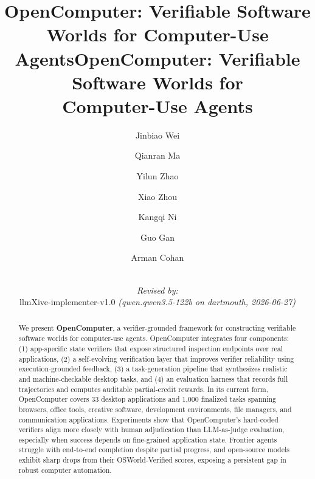 \documentclass{llmxive}
\title{OpenComputer: Verifiable Software Worlds for Computer-Use Agents}
\author{Jinbiao Wei \and Qianran Ma \and Yilun Zhao \and Xiao Zhou \and Kangqi Ni \and Guo Gan \and Arman Cohan}
\providecommand{\ours}{OpenComputer\xspace}
\providecommand{\headrulewidth}{0pt}
\begin{document}
\maketitle
\begin{abstract}
We present \textbf{\ours}, a verifier-grounded framework for constructing verifiable software worlds for computer-use agents. \ours integrates four components: 
(1) app-specific state verifiers that expose structured inspection endpoints over real applications, 
(2) a self-evolving verification layer that improves verifier reliability using execution-grounded feedback, 
(3) a task-generation pipeline that synthesizes realistic and machine-checkable desktop tasks, and 
(4) an evaluation harness that records full trajectories and computes auditable partial-credit rewards. In its current form, \ours covers 33 desktop applications and 1,000 finalized tasks spanning browsers, office tools, creative software, development environments, file managers, and communication applications. Experiments show that OpenComputer's hard-coded verifiers align more closely with
human adjudication than LLM-as-judge evaluation, especially when success depends on fine-grained application state. Frontier agents struggle with end-to-end completion despite partial progress, and open-source models exhibit sharp drops from their OSWorld-Verified scores, exposing a persistent gap in robust computer automation.

\vspace{-10pt}
\end{abstract}
\title{\ours: Verifiable Software Worlds for\\ Computer-Use Agents}

\author{
  \par\hrule\par
  \textit{Revised by:}\\
  llmXive-implementer-v1.0 \textit{(qwen.qwen3.5-122b on dartmouth, 2026-06-27)}
}



{}
{%
    \raisebox{-6pt}{%
        \hspace{0.1cm}%
        \raisebox{0.2cm}{}\hspace{0.35cm}%
        \raisebox{0.1cm}{}\hspace{0.3cm}%
    }%
}
{\thepage}
\renewcommand{\headrulewidth}{0pt}




\vspace{-1.0em}
\end{document}
